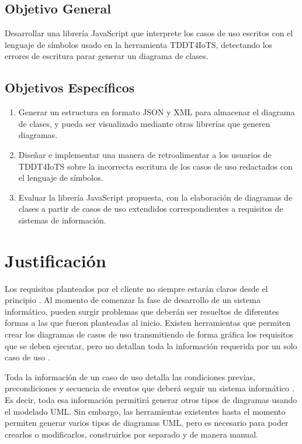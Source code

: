 \subsection{Objetivo General}

Desarrollar una librería JavaScript que interprete los casos de uso escritos con el lenguaje de símbolos usado en la herramienta TDDT4IoTS, detectando los errores de escritura parar generar un diagrama de clases. 

\subsection{Objetivos Específicos}

\begin{enumerate}
	\item Generar un estructura en formato JSON y XML para almacenar el diagrama de clases, y pueda ser visualizado mediante otras librerías que generen diagramas.
	
	\item Diseñar e implementar una manera de retroalimentar a los usuarios de TDDT4IoTS sobre la incorrecta escritura de los casos de uso redactados con el lenguaje de símbolos. 
	
	\item Evaluar la librería JavaScript propuesta, con la elaboración de diagramas de clases a partir de casos de uso extendidos correspondientes a requisitos de sistemas de información.
\end{enumerate}

\section{Justificación}

Los requisitos planteados por el cliente no siempre estarán claros desde el principio \parencite{iqbal2020}. Al momento de comenzar la fase de desarrollo de un sistema informático, pueden surgir problemas que deberán ser resueltos de diferentes formas a las que fueron planteadas al inicio. Existen herramientas que permiten crear los diagramas de casos de uso transmitiendo de forma gráfica los requisitos que se deben ejecutar, pero no detallan toda la información requerida por un solo caso de uso \parencite{Abdelnabi2021}.

Toda la información de un caso de uso detalla las condiciones previas, precondiciones y secuencia de eventos que deberá seguir un sistema informático \parencite{iqbal2020}. Es decir, toda esa información permitirá generar otros tipos de diagramas usando el modelado UML. Sin embargo, las herramientas existentes hasta el momento permiten generar varios tipos de diagramas UML, pero es necesario para poder crearlos o modificarlos, construirlos por separado y de manera manual.

